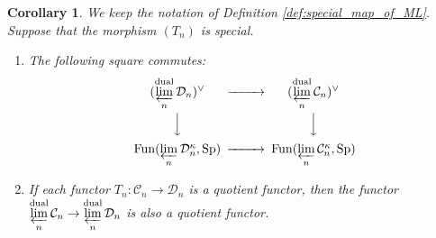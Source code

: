 \documentclass[11pt,leqno]{amsart}
\newtheorem{cor}[theo]{Corollary}
\numberwithin{equation}{section}
\newcommand{\prolim}[1][]{\mathop{\varprojlim}\limits_{#1}}
\newcommand{\dual}{\operatorname{dual}}
\newcommand{\cD}{{\mathcal D}}
\newcommand{\cC}{{\mathcal C}}
\newcommand{\Fun}{\operatorname{Fun}}
\newcommand{\Sp}{\operatorname{Sp}}
\begin{document}
\begin{cor}\label{cor:comm_square_for_duals_of_limits}
We keep the notation of Definition \ref{def:special_map_of_ML}. Suppose that the morphism $(T_n)$ is special.

\begin{enumerate}[label=(\roman*),ref=(\roman*)]
\item The following square commutes:
\begin{equation}
	\label{eq:key_comm_square_ML}
\begin{CD}
(\prolim[n]^{\dual}\cD_n)^{\vee} @>>> (\prolim[n]^{\dual}\cC_n)^{\vee}\\
@VVV @VVV\\
\Fun(\prolim[n]\cD_n^{\kappa},\Sp) @>>> \Fun(\prolim[n]\cC_n^{\kappa},\Sp)
\end{CD}
\end{equation} \label{comm_sqaure_for_duals_of_limits}

\item If each functor $T_n:\cC_n\to\cD_n$ is a quotient functor, then the functor $\prolim[n]^{\dual}\cC_n\to\prolim[n]^{\dual}\cD_n$ is also a quotient functor. \label{dualizable_limit_or_epi_is_epi}
\end{enumerate}
\end{cor}
\end{document}
